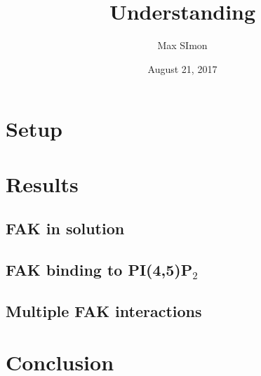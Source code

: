 \documentclass[
11pt, %
parskip=half, %
digital, %
oneside, %
]{bsc}
\title{Understanding}
\author{Max SImon}
\date{August 21, 2017}
\newcommand{\pip}{PI(4,5)P$_2$}
\begin{document}

%
%

%
%

%
%
\chapter{Setup}
%
\chapter{Results}
\section{FAK in solution}
%
\section{FAK binding to \pip{}}
%
%
%
\section{Multiple FAK interactions}
%
\chapter{Conclusion}

\end{document}
